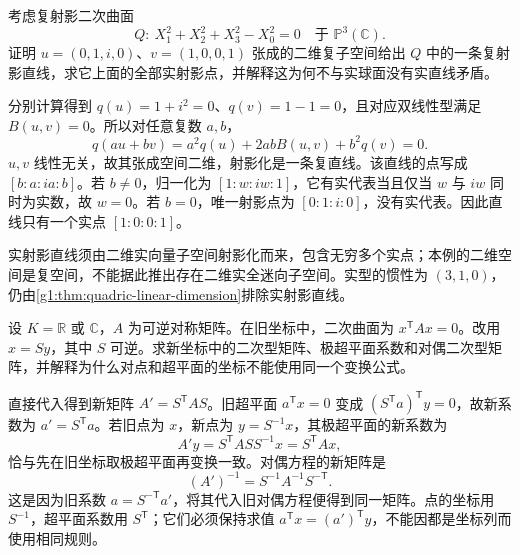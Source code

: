 \begin{exercise}
	\label{g1:ex:complex-line-real-sphere}
	考虑复射影二次曲面
	\[
		Q:\ X_1^2+X_2^2+X_3^2-X_0^2=0
		\quad\text{于 }\mathbb P^3(\mathbb C).
	\]
	证明 \(u=(0,1,i,0)\)、\(v=(1,0,0,1)\) 张成的二维复子空间给出 \(Q\) 中的一条复射影直线，求它上面的全部实射影点，并解释这为何不与实球面没有实直线矛盾。
\end{exercise}
\begin{solution}
	分别计算得到 \(q(u)=1+i^2=0\)、\(q(v)=1-1=0\)，且对应双线性型满足 \(B(u,v)=0\)。所以对任意复数 \(a,b\)，
	\[
		q(au+bv)=a^2q(u)+2abB(u,v)+b^2q(v)=0.
	\]
	\(u,v\) 线性无关，故其张成空间二维，射影化是一条复直线。该直线的点写成 \([b:a:ia:b]\)。若 \(b\ne0\)，归一化为 \([1:w:iw:1]\)，它有实代表当且仅当 \(w\) 与 \(iw\) 同时为实数，故 \(w=0\)。若 \(b=0\)，唯一射影点为 \([0:1:i:0]\)，没有实代表。因此直线只有一个实点 \([1:0:0:1]\)。

	实射影直线须由二维实向量子空间射影化而来，包含无穷多个实点；本例的二维空间是复空间，不能据此推出存在二维实全迷向子空间。实型的惯性为 \((3,1,0)\)，仍由\cref{g1:thm:quadric-linear-dimension}排除实射影直线。
\end{solution}

\begin{exercise}\label{g1:ex:polarity-coordinate-change}
	设 \(K=\mathbb R\) 或 \(\mathbb C\)，\(A\) 为可逆对称矩阵。在旧坐标中，二次曲面为 \(x^{\mathsf T}Ax=0\)。改用 \(x=Sy\)，其中 \(S\) 可逆。求新坐标中的二次型矩阵、极超平面系数和对偶二次型矩阵，并解释为什么对点和超平面的坐标不能使用同一个变换公式。
\end{exercise}
\begin{solution}
	直接代入得到新矩阵 \(A'=S^{\mathsf T}AS\)。旧超平面 \(a^{\mathsf T}x=0\) 变成 \((S^{\mathsf T}a)^{\mathsf T}y=0\)，故新系数为 \(a'=S^{\mathsf T}a\)。若旧点为 \(x\)，新点为 \(y=S^{-1}x\)，其极超平面的新系数为
	\[
		A'y=S^{\mathsf T}ASS^{-1}x=S^{\mathsf T}Ax,
	\]
	恰与先在旧坐标取极超平面再变换一致。对偶方程的新矩阵是
	\[
		(A')^{-1}=S^{-1}A^{-1}S^{-\mathsf T}.
	\]
	这是因为旧系数 \(a=S^{-\mathsf T}a'\)，将其代入旧对偶方程便得到同一矩阵。点的坐标用 \(S^{-1}\)，超平面系数用 \(S^{\mathsf T}\)；它们必须保持求值 \(a^{\mathsf T}x=(a')^{\mathsf T}y\)，不能因都是坐标列而使用相同规则。
\end{solution}

